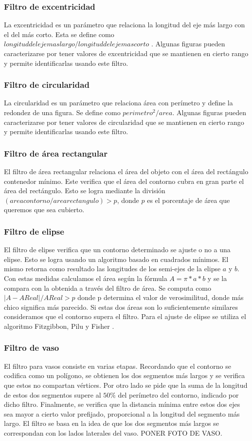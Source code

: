 	\subsubsection*{Filtro de excentricidad}
	La excentricidad es un parámetro que relaciona la longitud del eje más largo con el del más corto. Esta se define como 
	$longitud del eje mas largo/ longitud del eje mas corto$ . Algunas figuras pueden caracterizarse por tener valores de excentricidad
	que se mantienen en cierto rango y permite identificarlas usando este filtro.
	\subsubsection*{Filtro de circularidad}
	La circularidad es un parámetro que relaciona área con perímetro y define la redondez de una figura. Se define como $perimetro^2/area$. Algunas figuras pueden 
	caracterizarse por tener valores de circularidad que se mantienen en cierto rango y permite identificarlas usando este filtro.
	\subsubsection*{Filtro de área rectangular}
	El filtro de área rectangular relaciona el área del objeto con el área del rectángulo contenedor mínimo. Este verifica que el área
	del contorno cubra en gran parte el área del rectángulo. Esto se logra mediante la división $(area contorno / area rectangulo)> p$, donde 
	$p$ es el porcentaje de área que queremos que sea cubierto.
	\subsubsection*{Filtro de elipse}
	El filtro de elipse verifica que un contorno determinado se ajuste o no a una elipse. Esto se logra usando un algoritmo basado 
	en cuadrados mínimos. El mismo retorna como resultado las longitudes de los semi-ejes de la elipse $a$ y $b$. Con estas medidas calculamos
	el área según la fórmula $A=\pi*a*b$ y se la compara con la obtenida a través del filtro de área. Se computa como $|A-AReal|/ AReal > p$ donde p determina el
	valor de verosimilitud, donde más chico significa más parecido. Si estas dos áreas son lo suficientemente similares consideramos que el contorno supera el filtro. 
	Para el ajuste de elipse se utiliza el algoritmo Fitzgibbon, Pilu y Fisher \cite{Fitzgibbon99}.
	\subsubsection*{Filtro de vaso}
	El filtro para vasos consiste en varias etapas. Recordando que el contorno se codifica como un polígono, se obtienen los dos segmentos 
	más largos y se verifica que estos no compartan vértices. Por otro lado se pide que la suma de la longitud de estos dos segmentos supere al $50\%$ del 
	perímetro del contorno, indicado por dicho filtro. Finalmente, se verifica que la distancia mínima entre estos dos ejes sea mayor a cierto valor prefijado, proporcional a la
	longitud del segmento más largo. El filtro se basa en la idea de que los dos segmentos más largos se correspondan con los lados laterales del vaso. PONER FOTO
	DE VASO.
